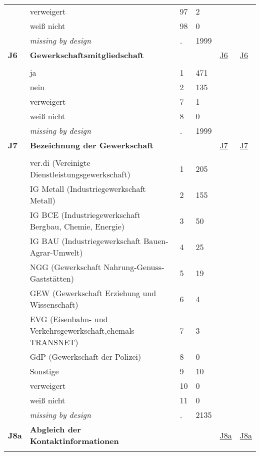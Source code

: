 \begin{longtable}{| L{2.45cm} | L{6cm} | C{1.5cm} | R{1cm} | C{2.25cm} | C{2.25cm} |}
   & verweigert & 97 & 2 &  &  \\ 
   & weiß nicht & 98 & 0 &  &  \\ 
   & \textit{missing by design} & \textit{.} & 1999 &  &  \\ 
   \midrule
\textbf{J6}\label{var:J6} & \textbf{Gewerkschaftsmitgliedschaft} &  &  & \hyperref[J6]{J6} & \hyperref[var:suf:J6]{J6} \\ 
   &  &  &  &  &  \\ 
   & ja & 1 & 471 &  &  \\ 
   & nein & 2 & 135 &  &  \\ 
   & verweigert & 7 & 1 &  &  \\ 
   & weiß nicht & 8 & 0 &  &  \\ 
   & \textit{missing by design} & \textit{.} & 1999 &  &  \\ 
   \midrule
\textbf{J7}\label{var:J7} & \textbf{Bezeichnung der Gewerkschaft} &  &  & \hyperref[J7]{J7} & \hyperref[var:suf:J7]{J7} \\ 
   &  &  &  &  &  \\ 
   & ver.di (Vereinigte Dienstleistungsgewerkschaft) & 1 & 205 &  &  \\ 
   & IG Metall (Industriegewerkschaft Metall) & 2 & 155 &  &  \\ 
   & IG BCE (Industriegewerkschaft Bergbau, Chemie, Energie) & 3 & 50 &  &  \\ 
   & IG BAU (Industriegewerkschaft Bauen-Agrar-Umwelt) & 4 & 25 &  &  \\ 
   & NGG (Gewerkschaft Nahrung-Genuss-Gaststätten) & 5 & 19 &  &  \\ 
   & GEW (Gewerkschaft Erziehung und Wissenschaft) & 6 & 4 &  &  \\ 
   & EVG (Eisenbahn- und Verkehrsgewerkschaft,ehemals TRANSNET) & 7 & 3 &  &  \\ 
   & GdP (Gewerkschaft der Polizei) & 8 & 0 &  &  \\ 
   & Sonstige & 9 & 10 &  &  \\ 
   & verweigert & 10 & 0 &  &  \\ 
   & weiß nicht & 11 & 0 &  &  \\ 
   & \textit{missing by design} & \textit{.} & 2135 &  &  \\ 
   \midrule
\textbf{J8a}\label{var:J8a} & \textbf{Abgleich der Kontaktinformationen} &  &  & \hyperref[J8a]{J8a} & \hyperref[var:suf:J8a]{J8a} \\ 
   &  &  &  &  &  \\ 

\end{longtable}
